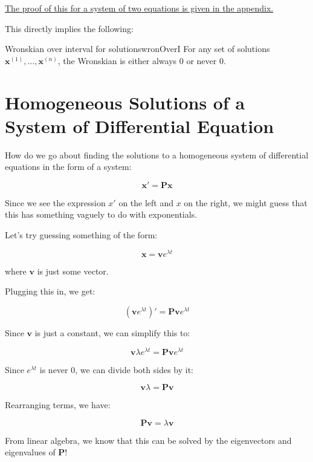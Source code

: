 \documentclass{report}
\begin{document}
\hyperref[sec:wronAbelSys]{The proof of this for a system of two equations is given in the appendix.}

This directly implies the following:

\begin{mytheo}{Wronskian over interval for solutions}{wronOverI}
    For any set of solutions $\mathbf{x}^{(1)}, \dots, \mathbf{x}^{(n)}$, the Wronskian is either always 0 or never 0.
\end{mytheo}


















\section{Homogeneous Solutions of a System of Differential Equation}
How do we go about finding the solutions to a homogeneous system of differential equations in the form of a system:

$$\mathbf{x'} = \mathbf{Px}$$

Since we see the expression $x'$ on the left and $x$ on the right, we might guess that this has something vaguely to do with exponentials.

Let's try guessing something of the form:

$$\mathbf{x} = \mathbf{v}e^{\lambda t}$$

where $\mathbf{v}$ is just some vector.

Plugging this in, we get:

$$(\mathbf{v}e^{\lambda t})' = \mathbf{Pv}e^{\lambda t}$$

Since $\mathbf{v}$ is just a constant, we can simplify this to:

$$\mathbf{v}\lambda e^{\lambda t} =  \mathbf{Pv}e^{\lambda t}$$

Since $e^{\lambda t}$ is never 0, we can divide both sides by it:

$$\mathbf{v}\lambda =  \mathbf{Pv}$$

Rearranging terms, we have:

$$\mathbf{Pv} = \lambda\mathbf{v}$$

From linear algebra, we know that this can be solved by the eigenvectors and eigenvalues of $\mathbf{P}$!
\end{document}
